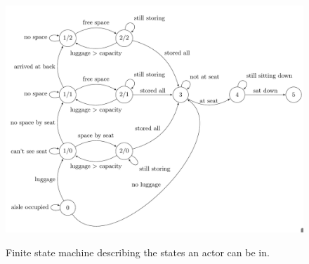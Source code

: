 \documentclass[11pt]{article}
\begin{document}
\begin{figure}[h!]

	\includegraphics[width=\linewidth]{images/fsm.png}
	\label{fig:fsm}
	\caption{Finite state machine describing the states an actor can be in.}


\end{figure}
\end{document}
